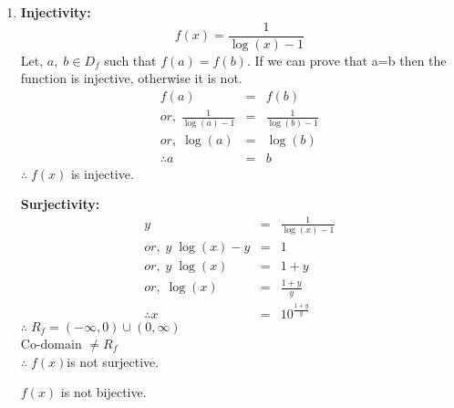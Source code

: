 \documentclass{article}
\begin{document}
\begin{enumerate}
\item{

\begin{minipage}[t]{0.4\linewidth}
\textbf{Injectivity:}
    $$f(x) = \frac{1}{\log{(x)}-1}$$
Let, $a,\;b\in D_f$ such that $f(a) = f(b)$. If we can prove that a=b then the function is injective, otherwise it is not.
\begin{eqnarray*}
    f(a) &=& f(b)\\
    or,\;\frac{1}{\log{(a)}-1} &=& \frac{1}{\log{(b)}-1}\\
    or,\; \log(a) &=& \log(b)\\
    \therefore a&=&b
\end{eqnarray*}
    $\therefore\;f(x)$ is injective.
\end{minipage}\hfill
\begin{minipage}[t]{0.4\linewidth}
\textbf{Surjectivity:}
\begin{eqnarray*}
    y &=& \frac{1}{\log(x)-1}\\
    or,\; y\;\log(x)-y &=& 1\\
    or,\; y\;\log(x) &=& 1+y\\
    or,\; \log(x) &=& \frac{1+y}{y}\\
    \therefore x &=& 10^{\frac{1+y}{y}}
\end{eqnarray*}
    $\therefore\;R_f = (-\infty, 0)\cup(0,\infty)$\\
Co-domain $\ne R_f$\\
    $\therefore\;f(x)$is not surjective.
\end{minipage}
\vspace{1cm}
\begin{center}
$f(x)$ is not bijective.
\end{center}
\vspace{1cm}
}


\end{enumerate}
\end{document}
